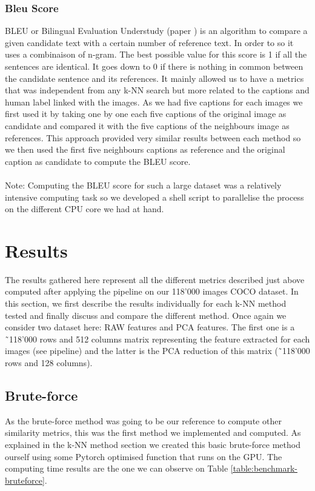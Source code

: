 \documentclass[a4paper]{article}
\begin{document}
	\subsubsection{Bleu Score}
		BLEU or Bilingual Evaluation Understudy (paper \cite{BLEU}) is an algorithm to compare a given candidate text with a certain number of reference text. In order to so it uses a combinaison of n-gram. The best possible value for this score is 1 if all the sentences are identical. It goes down to 0 if there is nothing in common between the candidate sentence and its references. It mainly allowed us to have a metrics that was independent from any k-NN search but more related to the captions and human label linked with the images. As we had five captions for each images we first used it by taking one by one each five captions of the original image as candidate and compared it with the five captions of the neighbours image as references. This approach provided very similar results between each method so we then used the first five neighbours captions as reference and the original caption as candidate to compute the BLEU score. 
		\\
		\\
		Note: Computing the BLEU score for such a large dataset was a relatively intensive computing task so we developed a shell script to parallelise the process on the different CPU core we had at hand. 
		
\section{Results}
The results gathered here represent all the different metrics described just above computed after applying the pipeline on our 118'000 images COCO dataset. In this section, we first describe the results individually for each k-NN method tested and finally discuss and compare the different method. Once again we consider two dataset here: RAW features and PCA features. The first one is a ˜118'000 rows and 512 columns matrix representing the feature extracted for each images (see pipeline) and the latter is the PCA reduction of this matrix (˜118'000 rows and 128 columns). 

	\subsection{Brute-force}
	
	As the brute-force method was going to be our reference to compute other similarity metrics, this was the first method we implemented and computed. As explained in the k-NN method section we created this basic brute-force method ourself using some Pytorch optimised function that runs on the GPU. The computing time results are the one we can observe on Table \ref{table:benchmark-bruteforce}.
	
\end{document}
